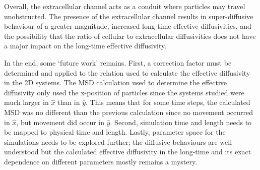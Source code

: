 	Overall, the extracellular channel acts as a conduit where particles may travel unobstructed. The presence of the extracellular channel results in super-diffusive behaviour of a greater magnitude, increased long-time effective diffusivities, and the possibility that the ratio of cellular to extracellular diffusivities does not have a major impact on the long-time effective diffusivity.
	
	\newpage
	
	In the end, some `future work' remains. First, a correction factor must be determined and applied to the relation used to calculate the effective diffusivity in the 2D systems. The MSD calculation used to determine the effective diffusivity only used the x-position of particles since the systems studied were much larger in $ \hat{x} $ than in $ \hat{y} $. This means that for some time steps, the calculated MSD was no different than the previous calculation since no movement occurred in $ \hat{x} $, but movement did occur in $ \hat{y} $. Second, simulation time and length needs to be mapped to physical time and length. Lastly, parameter space for the simulations needs to be explored further; the diffusive behaviours are well understood but the calculated effective diffusivity in the long-time and its exact dependence on different parameters mostly remains a mystery.